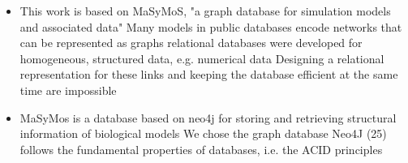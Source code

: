 \begin{itemize}
	\item This work is based on MaSyMoS, "a graph database for simulation models and associated data" \cite{Henkel2015}
	\subitem \cite{Henkel2015} Many models in public databases encode networks that can be represented as graphs
	\subitem \cite{Henkel2015} relational databases were developed for homogeneous, structured data, e.g. numerical data
	\subitem \cite{Henkel2015} Designing a relational representation for these links and keeping the database efficient at the same time are impossible
	
	\item \cite{Henkel2015} MaSyMos is a database based on neo4j for storing and retrieving structural information of biological models
	\subitem \cite{Henkel2015} We chose the graph database Neo4J (25)
	\subitem \cite{Henkel2015} follows the fundamental properties of databases, i.e. the ACID principles
	

\end{itemize}
